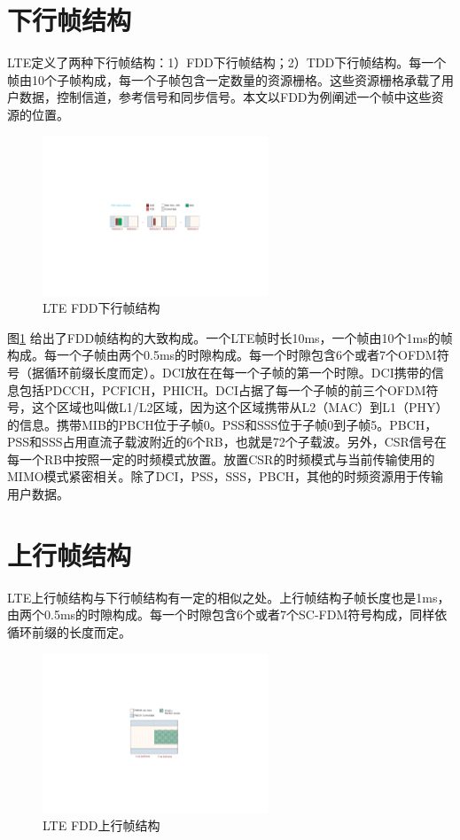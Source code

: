 \documentclass[10pt,a4paper,UTF8]{article}
\begin{document}
\section{下行帧结构}
\label{sec:orgheadline25}


LTE定义了两种下行帧结构：1）FDD下行帧结构；2）TDD下行帧结构。每一个帧由10个子帧构成，每一个子帧包含一定数量的资源栅格。这些资源栅格承载了用户数据，控制信道，参考信号和同步信号。本文以FDD为例阐述一个帧中这些资源的位置。
\begin{figure}[htb]
\centering
\includegraphics[width=0.6\textwidth]{../../img/20151105ltefddframe.pdf}
\caption{\label{fig:orgparagraph10}
LTE FDD下行帧结构}
\end{figure}

图\ref{fig:orgparagraph10} 给出了FDD帧结构的大致构成。一个LTE帧时长10ms，一个帧由10个1ms的帧构成。每一个子帧由两个0.5ms的时隙构成。每一个时隙包含6个或者7个OFDM符号（据循环前缀长度而定）。DCI放在在每一个子帧的第一个时隙。DCI携带的信息包括PDCCH，PCFICH，PHICH。DCI占据了每一个子帧的前三个OFDM符号，这个区域也叫做L1/L2区域，因为这个区域携带从L2（MAC）到L1（PHY）的信息。携带MIB的PBCH位于子帧0。PSS和SSS位于子帧0到子帧5。PBCH，PSS和SSS占用直流子载波附近的6个RB，也就是72个子载波。另外，CSR信号在每一个RB中按照一定的时频模式放置。放置CSR的时频模式与当前传输使用的MIMO模式紧密相关。除了DCI，PSS，SSS，PBCH，其他的时频资源用于传输用户数据。

\section{上行帧结构}
\label{sec:orgheadline26}


LTE上行帧结构与下行帧结构有一定的相似之处。上行帧结构子帧长度也是1ms，由两个0.5ms的时隙构成。每一个时隙包含6个或者7个SC-FDM符号构成，同样依循环前缀的长度而定。
\begin{figure}[htb]
\centering
\includegraphics[width=0.6\textwidth]{../../img/20151105lteuplinkfddframe.pdf}
\caption{\label{fig:orgparagraph11}
LTE FDD上行帧结构}
\end{figure}
\end{document}
